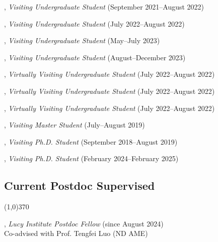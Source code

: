 \documentclass[10pt]{article}
\newenvironment{myindentpar}[1]%
{\begin{list}{}%
         {\setlength{\leftmargin}{#1}}%
         \item[]%
}
{\end{list}}
\newcounter{list}
\begin{document}
\begin{myindentpar}{0.75cm}
\hspace{-0.75cm}{\bf Yunxiang Yan}, \textit{Visiting Undergraduate Student} (September 2021--August 2022)

\hspace{-0.75cm}{\bf Qi Liu}, \textit{Visiting Undergraduate Student} (July 2022--August 2022)

\hspace{-0.75cm}{\bf Kairui Hu}, \textit{Visiting Undergraduate Student} (May--July 2023)

\hspace{-0.75cm}{\bf Yuxuan Kuang}, \textit{Visiting Undergraduate Student} (August--December 2023)

\hspace{-0.75cm}{\bf Xuan Zhang}, \textit{Virtually Visiting Undergraduate Student} (July 2022--August 2022)

\hspace{-0.75cm}{\bf Dong Liu}, \textit{Virtually Visiting Undergraduate Student} (July 2022--August 2022)

\hspace{-0.75cm}{\bf Yuchen Li}, \textit{Virtually Visiting Undergraduate Student} (July 2022--August 2022)

\hspace{-0.75cm}{\bf Zijian Hu}, \textit{Visiting Master Student} (July--August 2019)

\hspace{-0.75cm}{\bf Tianwen Jiang}, \textit{Visiting Ph.D. Student} (September 2018--August 2019)

\hspace{-0.75cm}{\bf Zhenyu Wu}, \textit{Visiting Ph.D. Student} (February 2024--February 2025)

\end{myindentpar}

\subsection{\sc Current Postdoc Supervised}
\vspace{-0.4cm} \line(1,0){370} \vspace{-0.1cm}

\begin{myindentpar}{0.75cm}

\hspace{-0.75cm}{\bf Sobin Alosious}, \textit{Lucy Institute Postdoc Fellow} (since August 2024) \\
	{Co-advised with Prof. Tengfei Luo (ND AME)}

\end{myindentpar}
\end{document}

